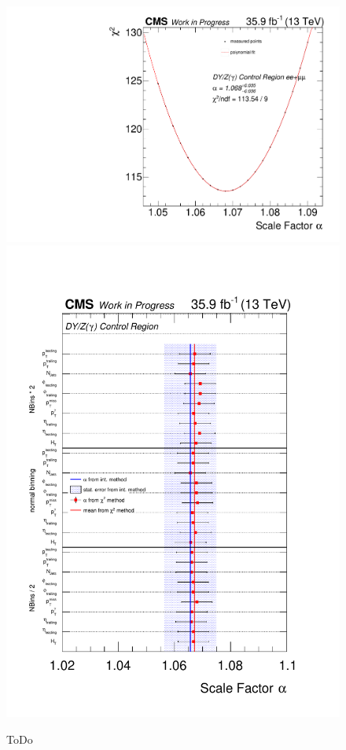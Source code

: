 \begin{figure}[htb]
 \centering
 \includegraphics[width=\pairwidth]{figures/plots_CR/chi/DY_LL_met}
 \includegraphics[width=\pairwidth]{figures/plots_CR/chi/DY_CompareLL}
 \caption{ToDo}
 \label{fig:chiDY}
\end{figure}

